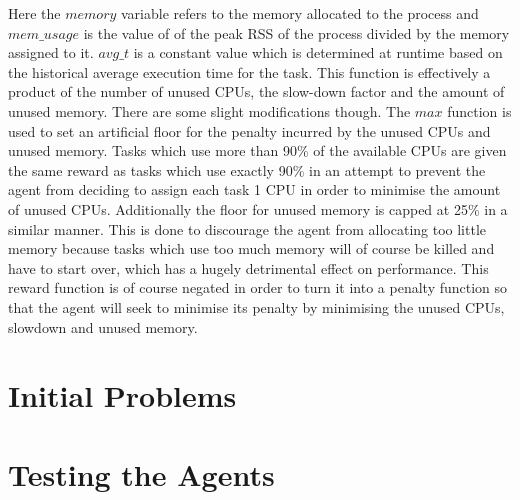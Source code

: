 Here the $memory$ variable refers to the memory allocated to the process and $mem\_usage$ is the value of of the peak RSS of the process divided by the memory assigned to it. $avg\_t$ is a constant value which is determined at runtime based on the historical average execution time for the task. This function is effectively a product of the number of unused CPUs, the slow-down factor and the amount of unused memory. There are some slight modifications though. The $max$ function is used to set an artificial floor for the penalty incurred by the unused CPUs and unused memory. Tasks which use more than 90\% of the available CPUs are given the same reward as tasks which use exactly 90\% in an attempt to prevent the agent from deciding to assign each task 1 CPU in order to minimise the amount of unused CPUs. Additionally the floor for unused memory is capped at 25\% in a similar manner. This is done to discourage the agent from allocating too little memory because tasks which use too much memory will of course be killed and have to start over, which has a hugely detrimental effect on performance. This reward function is of course negated in order to turn it into a penalty function so that the agent will seek to minimise its penalty by minimising the unused CPUs, slowdown and unused memory.

\section{Initial Problems}
\label{sec:initial_problems}

\section{Testing the Agents}
\label{sec:testing}
